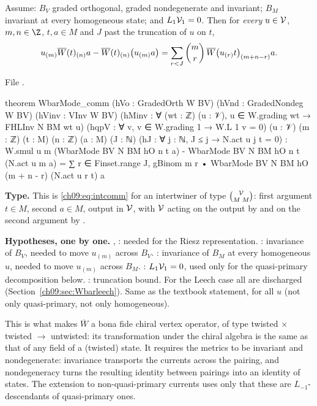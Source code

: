 \begin{theorem}\label{ch09:thm:Wbarcomm}
Assume: $B_V$ graded orthogonal, graded nondegenerate and invariant; $B_M$ invariant at every
homogeneous state; and $L_1\mathcal{V}_1=0$. Then for \emph{every} $u\in\mathcal{V}$, $m,n\in\Z$, $t,a\in M$
and $J$ past the truncation of $u$ on $t$,
\begin{equation}\label{ch09:eq:Wbarcomm}
u_{(m)}\overline{W}(t)_{(n)}a-\overline{W}(t)_{(n)}\big(u_{(m)}a\big)=\sum_{r<J}\binom mr\,\overline{W}\big(u_{(r)}t\big)_{(m+n-r)}a .
\end{equation}
\end{theorem}
\noindent File .
\begin{leancode}
theorem WbarMode_comm (hVo : GradedOrth W BV) (hVnd : GradedNondeg W BV) (hVinv : VInv W BV)
    (hMinv : ∀ (wt : ℤ) (u : 𝒱), u ∈ W.grading wt → FHLInv N BM wt u)
    (hqpV : ∀ v, v ∈ W.grading 1 → W.L 1 v = 0) (u : 𝒱) (m : ℤ) (t : M) (n : ℤ) (a : M)
    (J : ℕ) (hJ : ∀ j : ℕ, J ≤ j → N.act u j t = 0) :
    W.smul u m (WbarMode BV N BM hO n t a) - WbarMode BV N BM hO n t (N.act u m a)
      = ∑ r ∈ Finset.range J, gBinom m r • WbarMode BV N BM hO (m + n - r) (N.act u r t) a
\end{leancode}
\begin{dictionary}
\textbf{Type.} This is \eqref{ch09:eq:intcomm} for an intertwiner of type $\binom{\mathcal{V}}{M\;M}$:
first argument $t\in M$, second $a\in M$, output in $\mathcal{V}$, with $\mathcal{V}$ acting on the output by
 and on the second argument by .

\textbf{Hypotheses, one by one.} , : needed for the Riesz representation.
: invariance of $B_V$, needed to move $u_{(m)}$ across $B_V$. : invariance
of $B_M$ at every homogeneous $u$, needed to move $u_{(m)}$ across $B_M$. :
$L_1\mathcal{V}_1=0$, used only for the quasi-primary decomposition below. : truncation bound.
For the Leech case all are discharged (Section~\ref{ch09:sec:Wbarleech}). Same as the textbook
statement, for all $u$ (not only quasi-primary, not only homogeneous).
\end{dictionary}
\begin{physics}
This is what makes $\overline W$ a bona fide chiral vertex operator, of type twisted $\times$ twisted $\to$ untwisted: its transformation under the chiral algebra is the same as that of any field of a (twisted) state. It requires the metrics to be invariant and nondegenerate: invariance transports the currents across the pairing, and nondegeneracy turns the resulting identity between pairings into an identity of states. The extension to non-quasi-primary currents uses only that these are $L_{-1}$-descendants of quasi-primary ones.
\end{physics}

